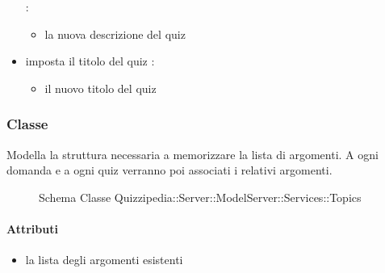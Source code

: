 \begin{itemize}
 :
\begin{itemize}
\item {}
\newline
la nuova descrizione del quiz
\end{itemize}
\item {}
\newline
imposta il titolo del quiz
\newline
{} :
\begin{itemize}
\item {}
\newline
il nuovo titolo del quiz
\end{itemize}
\end{itemize}
\subsubsection{Classe }
Modella la struttura necessaria a memorizzare la lista di argomenti. A ogni domanda e a ogni quiz verranno poi associati i relativi argomenti.
\begin{figure}[H]
\centering
\noindent{}
\caption[Schema Classe Topics]{Schema Classe Quizzipedia::Server::ModelServer::Services::Topics}
\end{figure}
\paragraph{Attributi}
\begin{itemize}
\item {}
\newline
la lista degli argomenti esistenti
\end{itemize}
